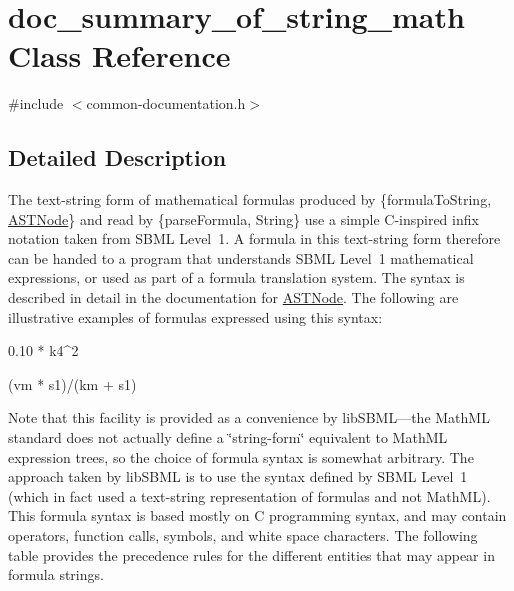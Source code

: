 \hypertarget{classdoc__summary__of__string__math}{}\section{doc\+\_\+summary\+\_\+of\+\_\+string\+\_\+math Class Reference}
\label{classdoc__summary__of__string__math}


{\ttfamily \#include $<$common-\/documentation.\+h$>$}



\subsection{Detailed Description}
\begin{DoxyParagraph}{}
The text-\/string form of mathematical formulas produced by \{formula\+To\+String, \hyperlink{class_a_s_t_node}{A\+S\+T\+Node}\} and read by \{parse\+Formula, String\} use a simple C-\/inspired infix notation taken from S\+B\+ML Level~1. A formula in this text-\/string form therefore can be handed to a program that understands S\+B\+ML Level~1 mathematical expressions, or used as part of a formula translation system. The syntax is described in detail in the documentation for \hyperlink{class_a_s_t_node}{A\+S\+T\+Node}. The following are illustrative examples of formulas expressed using this syntax\+: \begin{DoxyVerb}0.10 * k4^2
\end{DoxyVerb}
 \begin{DoxyVerb}(vm * s1)/(km + s1)
\end{DoxyVerb}

\end{DoxyParagraph}
Note that this facility is provided as a convenience by lib\+S\+B\+ML---the Math\+ML standard does not actually define a \char`\"{}string-\/form\char`\"{} equivalent to Math\+ML expression trees, so the choice of formula syntax is somewhat arbitrary. The approach taken by lib\+S\+B\+ML is to use the syntax defined by S\+B\+ML Level~1 (which in fact used a text-\/string representation of formulas and not Math\+ML). This formula syntax is based mostly on C programming syntax, and may contain operators, function calls, symbols, and white space characters. The following table provides the precedence rules for the different entities that may appear in formula strings.



